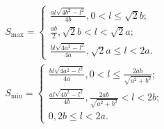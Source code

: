 \begin{solution}
\begin{itemize}
\end{itemize}
\begin{align*}&S_{\mathrm{max}}=\begin{cases}\frac{al\sqrt{4b^2-l^2}}{4b},0<l\leq\sqrt{2}b;\\\frac{ab}{2},\sqrt{2}b<l<\sqrt{2}a;\\\frac{bl\sqrt{4a^2-l^2}}{4a},\sqrt{2}a\leq l<2a.&\end{cases}\\&S_{\mathrm{min}}=\begin{cases}\frac{bl\sqrt{4a^2-l^2}}{4a},0<l\leq\frac{2ab}{\sqrt{a^2+b^2}};\\\frac{al\sqrt{4b^2-l^2}}{4b},\frac{2ab}{\sqrt{a^2+b^2}}<l<2b;\\0,2b\leq l<2a.&\end{cases}\end{align*}
\end{solution}

